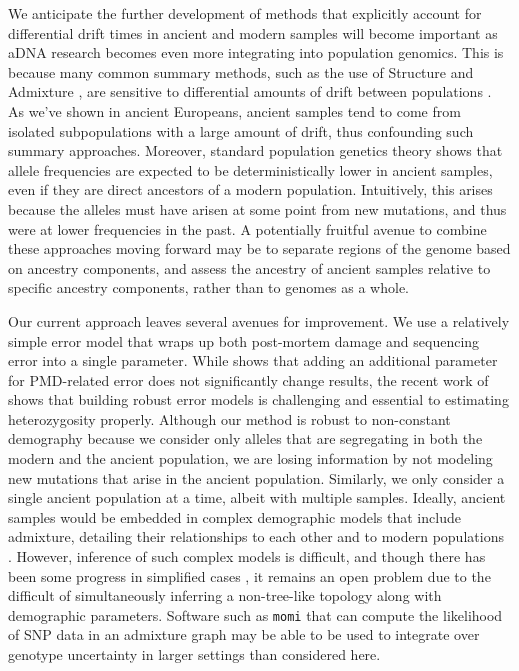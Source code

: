 \documentclass[11pt, oneside]{article}   	%
\begin{document}
We anticipate the further development of methods that explicitly account for differential drift times in ancient and modern samples will become important as aDNA research becomes even more integrating into population genomics. This is because many common summary methods, such as the use of Structure \citep{pritchard2000inference} and Admixture \citep{alexander2009fast}, are sensitive to differential amounts of drift between populations \citep{falush2016tutorial}. As we've shown in ancient Europeans, ancient samples tend to come from isolated subpopulations with a large amount of drift, thus confounding such summary approaches. Moreover, standard population genetics theory shows that allele frequencies are expected to be deterministically lower in ancient samples, even if they are direct ancestors of a modern population. Intuitively, this arises because the alleles must have arisen at some point from new mutations, and thus were at lower frequencies in the past. A potentially fruitful avenue to combine these approaches moving forward may be to separate regions of the genome based on ancestry components, and assess the ancestry of ancient samples relative to specific ancestry components, rather than to genomes as a whole.

Our current approach leaves several avenues for improvement. We use a relatively simple error model that wraps up both post-mortem damage and sequencing error into a single parameter. While \citet{racimo2016joint} shows that adding an additional parameter for PMD-related error does not significantly change results, the recent work of \citet{kousathanas2017inferring} shows that building robust error models is challenging and essential to estimating heterozygosity properly. Although our method is robust to non-constant demography because we consider only alleles that are segregating in both the modern and the ancient population, we are losing information by not modeling new mutations that arise in the ancient population. Similarly, we only consider a single ancient population at a time, albeit with multiple samples. Ideally, ancient samples would be embedded in complex demographic models that include admixture, detailing their relationships to each other and to modern populations \citep{patterson2012ancient, lipson2017working}. However, inference of such complex models is difficult, and though there has been some progress in simplified cases \citep{lipson2014reconstructing, pickrell2012inference}, it remains an open problem due to the difficult of simultaneously inferring a non-tree-like topology along with demographic parameters. Software such as \texttt{momi} \citep{kamm2016efficient} that can compute the likelihood of SNP data in an admixture graph may be able to be used to integrate over genotype uncertainty in larger settings than considered here. 
\end{document}
